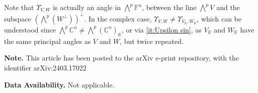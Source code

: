 \documentclass{birkjour}
\theoremstyle{definition}
\def\R			{\mathds{R}}
\def\C			{\mathds{C}}
\def\F			{\mathds{F}}
\begin{document}
Note that $\Upsilon_{V,W}$ is actually an angle in $\bigwedge^p\F^n$, 
between the line $\bigwedge^p V$ and the subspace $(\bigwedge^p(W^\perp))^\perp$.
In the complex case,  $\Upsilon_{V,W} \neq \Upsilon_{V_\R,W_\R}$, 
which can be understood since $\bigwedge^p \C^n \neq \bigwedge^p (\C^n)_\R$,
or via \ref{it:Upsilon sin}, as $V_\R$ and $W_\R$ have the same principal angles as $V$ and $W$, but twice repeated.




\vspace{6pt}

\noindent
\textbf{Note.} This article has been posted to the arXiv e-print repository, with the identifier arXiv:2403.17022

\vspace{6pt}

\noindent
\textbf{Data Availability.} Not applicable. 


% 
%
\end{document}
